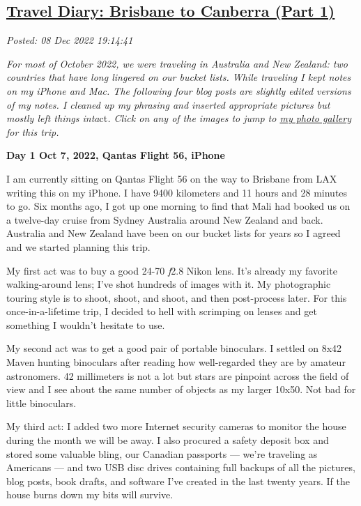 %

\subsection*{\href{http://analyzethedatanotthedrivel.org/2022/12/08/travel-diary-brisbane-to-canberra-part-1/}{Travel Diary: Brisbane to Canberra (Part 1)}}


\noindent\emph{Posted: 08 Dec 2022 19:14:41}
\vspace{6pt}

\emph{For most of October 2022, we were traveling in
Australia and New Zealand: two countries that have long lingered on our
bucket lists. While traveling I kept notes on my iPhone and Mac. The
following four blog posts are slightly edited versions of my notes. I
cleaned up my phrasing and inserted appropriate pictures but mostly left
things inta}ct\emph{. Click on any of the images to jump to
\href{https://conceptcontrol.smugmug.com/Trips/Overseas/Australia-New-Zealand-2022/}{my
photo gallery} for this trip.}

\textbf{Day 1 Oct 7, 2022, Qantas Flight 56, iPhone}

I am currently sitting on Qantas Flight 56 on the way to Brisbane from
LAX writing this on my iPhone. I have 9400 kilometers and 11 hours and
28 minutes to go. Six months ago, I got up one morning to find that Mali
had booked us on a twelve-day cruise from Sydney Australia around New
Zealand and back. Australia and New Zealand have been on our bucket
lists for years so I agreed and we started planning this trip.

My first act was to buy a good 24-70 \textit{f}2.8 Nikon lens. It's already my
favorite walking-around lens; I've shot hundreds of images with it. My
photographic touring style is to shoot, shoot, and shoot, and then
post-process later. For this once-in-a-lifetime trip, I decided to hell
with scrimping on lenses and get something I wouldn't hesitate to use.

My second act was to get a good pair of portable binoculars. I settled
on 8x42 Maven hunting binoculars after reading how well-regarded they
are by amateur astronomers. 42 millimeters is not a lot but stars are
pinpoint across the field of view and I see about the same number of
objects as my larger 10x50. Not bad for little binoculars.

My third act: I added two more Internet security cameras to monitor the
house during the month we will be away. I also procured a safety deposit
box and stored some valuable bling, our Canadian passports --- we're
traveling as Americans --- and two USB disc drives containing full
backups of all the pictures, blog posts, book drafts, and software I've
created in the last twenty years. If the house burns down my bits will
survive.

